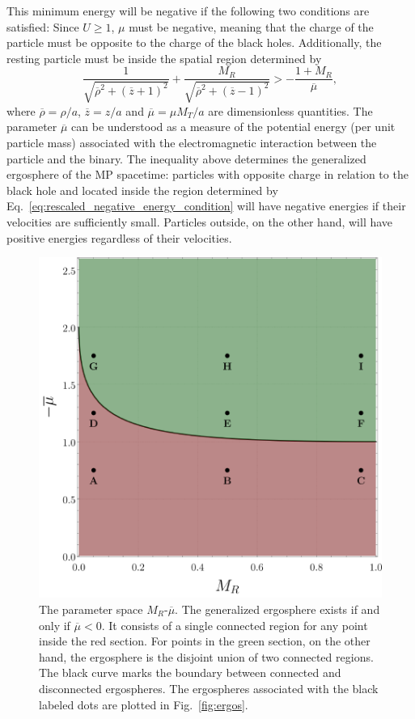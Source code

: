This minimum energy will be negative if the following two conditions are satisfied: Since $U \ge 1$, $\mu$ must be negative, meaning that the charge of the particle must be opposite to the charge of the black holes. Additionally, the resting particle must be inside the spatial region determined by
\begin{equation} \label{eq:rescaled_negative_energy_condition}
  \frac{1}{\sqrt{\overline{\rho}^2 + (\overline{z}+1)^2}} + \frac{M_R}{\sqrt{\overline{\rho}^2 + (\overline{z}-1)^2}} > - \frac{1+M_R}{\overline{\mu}},
\end{equation}
where $\overline{\rho} = \rho/a$, $\overline{z} = z/a$ and $\overline \mu =  \mu M_T/a$ are dimensionless quantities. The parameter $\overline \mu$ can be understood as a measure of the potential energy (per unit particle mass) associated with the electromagnetic interaction between the particle and the binary.
The inequality above determines the generalized ergosphere of the MP spacetime: particles with opposite charge in relation to the black hole and located inside the region determined by Eq.~\eqref{eq:rescaled_negative_energy_condition} will have negative energies if their velocities are sufficiently small. Particles outside, on the other hand, will have positive energies regardless of their velocities.

\begin{figure}[!ht]
  \centering
  \includegraphics[width=\linewidth]{img/penrose_binaries/fig1.pdf}
  \caption{The parameter space $M_R$-$\overline \mu$. The generalized ergosphere exists if and only if $\overline \mu < 0$. It consists of a single connected region for any point inside the red section. For points in the green section, on the other hand, the ergosphere is the disjoint union of two connected regions. The black curve marks the boundary between connected and disconnected ergospheres. The ergospheres associated with the black labeled dots are plotted in Fig.~\ref{fig:ergos}.}
  \label{fig:regions}
\end{figure}

